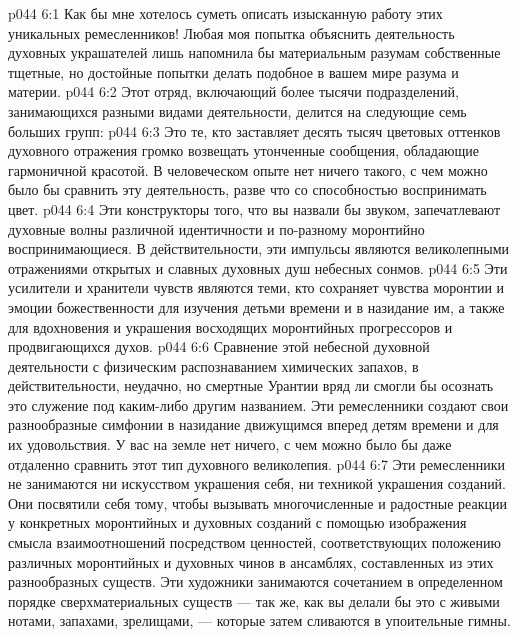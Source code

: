 \vs p044 6:1 Как бы мне хотелось суметь описать изысканную работу этих уникальных ремесленников! Любая моя попытка объяснить деятельность духовных украшателей лишь напомнила бы материальным разумам собственные тщетные, но достойные попытки делать подобное в вашем мире разума и материи.
\vs p044 6:2 Этот отряд, включающий более тысячи подразделений, занимающихся разными видами деятельности, делится на следующие семь больших групп:
\vs p044 6:3 \bibnobreakspace {} Это те, кто заставляет десять тысяч цветовых оттенков духовного отражения громко возвещать утонченные сообщения, обладающие гармоничной красотой. В человеческом опыте нет ничего такого, с чем можно было бы сравнить эту деятельность, разве что со способностью воспринимать цвет.
\vs p044 6:4 \bibnobreakspace {} Эти конструкторы того, что вы назвали бы звуком, запечатлевают духовные волны различной идентичности и по\hyp{}разному моронтийно воспринимающиеся. В действительности, эти импульсы являются великолепными отражениями открытых и славных духовных душ небесных сонмов.
\vs p044 6:5 \bibnobreakspace {} Эти усилители и хранители чувств являются теми, кто сохраняет чувства моронтии и эмоции божественности для изучения детьми времени и в назидание им, а также для вдохновения и украшения восходящих моронтийных прогрессоров и продвигающихся духов.
\vs p044 6:6 \bibnobreakspace {} Сравнение этой небесной духовной деятельности с физическим распознаванием химических запахов, в действительности, неудачно, но смертные Урантии вряд ли смогли бы осознать это служение под каким\hyp{}либо другим названием. Эти ремесленники создают свои разнообразные симфонии в назидание движущимся вперед детям времени и для их удовольствия. У вас на земле нет ничего, с чем можно было бы даже отдаленно сравнить этот тип духовного великолепия.
\vs p044 6:7 \bibnobreakspace {} Эти ремесленники не занимаются ни искусством украшения себя, ни техникой украшения созданий. Они посвятили себя тому, чтобы вызывать многочисленные и радостные реакции у конкретных моронтийных и духовных созданий с помощью изображения смысла взаимоотношений посредством ценностей, соответствующих положению различных моронтийных и духовных чинов в ансамблях, составленных из этих разнообразных существ. Эти художники занимаются сочетанием в определенном порядке сверхматериальных существ --- так же, как вы делали бы это с живыми нотами, запахами, зрелищами, --- которые затем сливаются в упоительные гимны.
